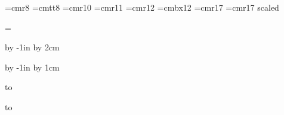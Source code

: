 

\vsize=297mm
\hsize=210mm



\nopagenumbers


\parindent=0pt

\def\epsfsize#1#2{#1}

\font\small=cmr8
\font\smalltt=cmtt8
\font\medium=cmr10
\font\largemed=cmr11
\font\large=cmr12
\font\largebx=cmbx12
\font\Large=cmr17
\font\huge=cmr17 scaled 


\headline={\hfil}

\advance\voffset by -1in
\advance\voffset by 2cm

\advance\hoffset by -1in
\advance\hoffset by 1cm

\vskip2cm

\def\epsfsize#1#2{#1}

\vbox to 
\vfil\eject

\vbox to 
\vfil\eject

\bye


\bye




